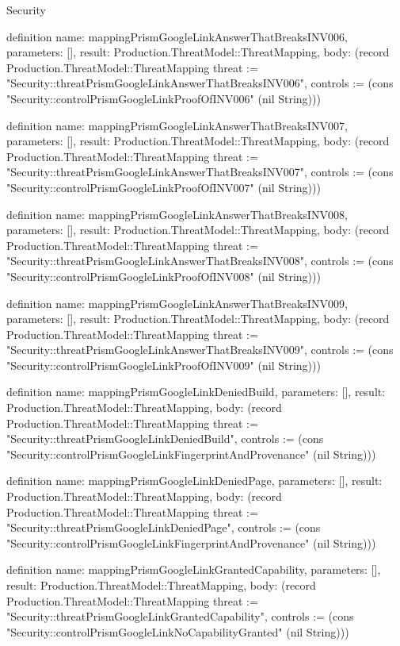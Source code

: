 \begin{lexlean}{Security}
\begin{semanticmodule}
definition{
  name: mappingPrismGoogleLinkAnswerThatBreaksINV006,
  parameters: [],
  result: Production.ThreatModel::ThreatMapping,
  body: (record Production.ThreatModel::ThreatMapping {threat := "Security::threatPrismGoogleLinkAnswerThatBreaksINV006", controls := (cons "Security::controlPrismGoogleLinkProofOfINV006" (nil String))})
}

definition{
  name: mappingPrismGoogleLinkAnswerThatBreaksINV007,
  parameters: [],
  result: Production.ThreatModel::ThreatMapping,
  body: (record Production.ThreatModel::ThreatMapping {threat := "Security::threatPrismGoogleLinkAnswerThatBreaksINV007", controls := (cons "Security::controlPrismGoogleLinkProofOfINV007" (nil String))})
}

definition{
  name: mappingPrismGoogleLinkAnswerThatBreaksINV008,
  parameters: [],
  result: Production.ThreatModel::ThreatMapping,
  body: (record Production.ThreatModel::ThreatMapping {threat := "Security::threatPrismGoogleLinkAnswerThatBreaksINV008", controls := (cons "Security::controlPrismGoogleLinkProofOfINV008" (nil String))})
}

definition{
  name: mappingPrismGoogleLinkAnswerThatBreaksINV009,
  parameters: [],
  result: Production.ThreatModel::ThreatMapping,
  body: (record Production.ThreatModel::ThreatMapping {threat := "Security::threatPrismGoogleLinkAnswerThatBreaksINV009", controls := (cons "Security::controlPrismGoogleLinkProofOfINV009" (nil String))})
}

definition{
  name: mappingPrismGoogleLinkDeniedBuild,
  parameters: [],
  result: Production.ThreatModel::ThreatMapping,
  body: (record Production.ThreatModel::ThreatMapping {threat := "Security::threatPrismGoogleLinkDeniedBuild", controls := (cons "Security::controlPrismGoogleLinkFingerprintAndProvenance" (nil String))})
}

definition{
  name: mappingPrismGoogleLinkDeniedPage,
  parameters: [],
  result: Production.ThreatModel::ThreatMapping,
  body: (record Production.ThreatModel::ThreatMapping {threat := "Security::threatPrismGoogleLinkDeniedPage", controls := (cons "Security::controlPrismGoogleLinkFingerprintAndProvenance" (nil String))})
}

definition{
  name: mappingPrismGoogleLinkGrantedCapability,
  parameters: [],
  result: Production.ThreatModel::ThreatMapping,
  body: (record Production.ThreatModel::ThreatMapping {threat := "Security::threatPrismGoogleLinkGrantedCapability", controls := (cons "Security::controlPrismGoogleLinkNoCapabilityGranted" (nil String))})
}


\end{semanticmodule}
\end{lexlean}
